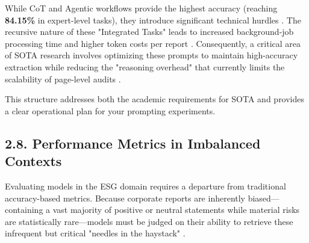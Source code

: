 \documentclass{article}
\begin{document}
While CoT and Agentic workflows provide the highest accuracy (reaching \textbf{84.15\%} in expert-level tasks), they introduce significant technical hurdles  \parencite{yilei_zhao_b7bbd9c8}. The recursive nature of these "Integrated Tasks" leads to increased background-job processing time and higher token costs per report  \parencite{yilei_zhao_cbb1b53f}. Consequently, a critical area of SOTA research involves optimizing these prompts to maintain high-accuracy extraction while reducing the "reasoning overhead" that currently limits the scalability of page-level audits  \parencite[]{seyed_alireza_mousavian_anaraki_b56a1c0f, mattia_birti_c097e3e8}.

This structure addresses both the academic requirements for SOTA and provides a clear operational plan for your prompting experiments.


\subsection*{2.8. Performance Metrics in Imbalanced Contexts}

Evaluating models in the ESG domain requires a departure from traditional accuracy-based metrics. Because corporate reports are inherently biased—containing a vast majority of positive or neutral statements while material risks are statistically rare—models must be judged on their ability to retrieve these infrequent but critical "needles in the haystack"  \parencite[]{tae_sun_chung_e16a4c18, yinan_yu_e282fd98}.
\end{document}
